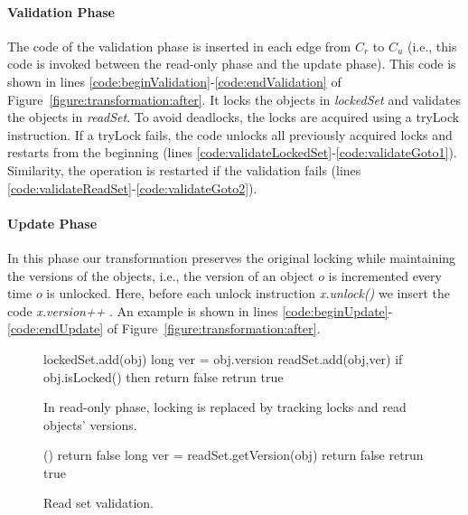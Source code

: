 \paragraph{Validation Phase}
The code of the validation phase is inserted in each edge from $C_r$ to $C_u$ (i.e., this code is invoked between the read-only phase and the update phase).
This code is shown in lines \ref{code:beginValidation}-\ref{code:endValidation} of Figure~\ref{figure:transformation:after}.
It locks the objects in \emph{lockedSet} and validates the objects in \emph{readSet}.
To avoid deadlocks, the locks are acquired using a tryLock
instruction.
If a tryLock fails, the code unlocks  all
previously acquired locks and restarts from the beginning
(lines \ref{code:validateLockedSet}-\ref{code:validateGoto1}).
Similarity, the operation is restarted if the validation fails (lines \ref{code:validateReadSet}-\ref{code:validateGoto2}).

\paragraph{Update Phase}
In this phase our transformation preserves the original locking while maintaining the versions of the objects, i.e., the version of an object $o$ is incremented every time $o$ is unlocked.
Here, before each unlock instruction \emph{\ttfamily x.unlock()} we insert the code \emph{\ttfamily x.version++} .
An example is shown in lines \ref{code:beginUpdate}-\ref{code:endUpdate} of Figure~\ref{figure:transformation:after}.


\begin{figure}
\scriptsize
\begin{algorithmic}[1]{}
		{\ttfamily
		\State lockedSet.add(obj) \label{code:lockedSet:add}
			\State long ver = obj.version \label{code:track:getVersion}
			\State readSet.add(obj,ver)
			\State if {obj.isLocked()} then return false \label{code:track:returnFalse}
			\State retrun true
		\EndFunction
		}
\end{algorithmic}
\caption{ In read-only phase, locking is replaced by
tracking locks and read
objects' versions.
\label{figure::track}}
\end{figure}




\begin{figure}
\scriptsize
\begin{algorithmic}[1]{}
		{\ttfamily
		()
			\State return false 
			\EndIf
			\State long ver = readSet.getVersion(obj)
				\State return false 
			\EndIf
		\EndFor
		\State retrun true 
		\EndFunction
		}
\end{algorithmic}
\caption{Read set validation.\label{figure::validate}}
\end{figure}

